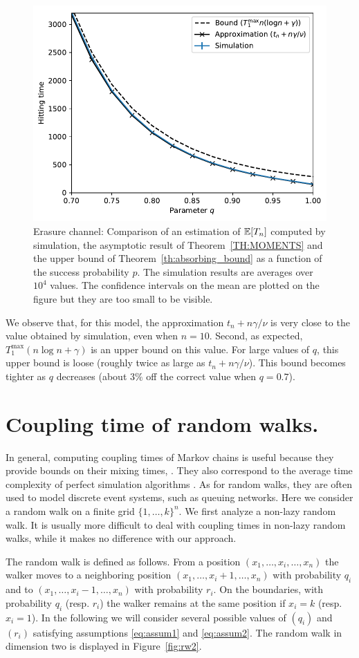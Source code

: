 \documentclass{aptpub}
\newcommand\expect[1]{\mathchoice{\bexpect{#1}}{\sexpect{#1}}{\sexpect{#1}}{\sexpect{#1}}}
\newcommand\bexpect[1]{\mathbb{E}\left[#1\right]}
\newcommand\sexpect[1]{\mathbb{E}[#1]}
\begin{document}
\begin{figure}[ht]
  \centering
  \includegraphics[width=.6\linewidth]{erasure_channel}
  \caption{Erasure channel: Comparison of an estimation of
    $\expect{T_n}$ computed by simulation, the asymptotic result of
    Theorem~\ref{TH:MOMENTS} and the upper bound of
    Theorem~\ref{th:absorbing_bound} as a function of the success
    probability $p$. The simulation results are averages over $10^4$
    values. The confidence intervals on the mean are plotted on the
    figure but they are too small to be visible. }
  \label{fig:erasure_result}
\end{figure}

We observe that, for this model, the approximation $t_n+n\gamma/\nu$
is very close to the value obtained by simulation, even when
$n=10$. Second, as expected, $T^{\max}_1(n\log n+\gamma)$ is an upper
bound on this value. For large values of $q$, this upper bound is loose
(roughly twice as large as  $t_n+n\gamma/\nu$). This bound becomes
tighter as $q$ decreases (about $3\%$ off the correct value when
$q=0.7$).


\section{Coupling  time of random walks.}
\label{sec:rw}


In general, computing 
coupling times of Markov chains is  useful because they provide
bounds on their mixing times,
\cite{peres}. They also correspond to the average time complexity of perfect simulation algorithms \cite{PW96}.
As for random walks, they are often used to model discrete event
systems, such as queuing networks.
Here we consider a random walk on a finite grid $\{1,\dots,k\}^n$.
 We first analyze a non-lazy random walk. It is usually more difficult to
deal with coupling times in non-lazy random walks, while it makes no
difference with our approach.

The random walk is defined as follows. 
From a position $(x_1,\ldots,x_i,\ldots,x_n)$ the walker moves to a
neighboring position $(x_1,\ldots,x_i+1, \ldots, x_n)$ with
probability $q_i$ and to $(x_1,\ldots,x_i-1 , \ldots, x_n)$ with
probability $r_i$.  On the boundaries, with probability $q_i$
(resp. $r_i$) the walker remains at the same position if $x_i = k$
(resp. $x_i = 1$). In the following we will consider several possible
values of $(q_i)$ and $(r_i)$ satisfying assumptions \eqref{eq:assum1}
and \eqref{eq:assum2}.  The random walk in dimension two is displayed
in Figure~\ref{fig:rw2}.
\end{document}
